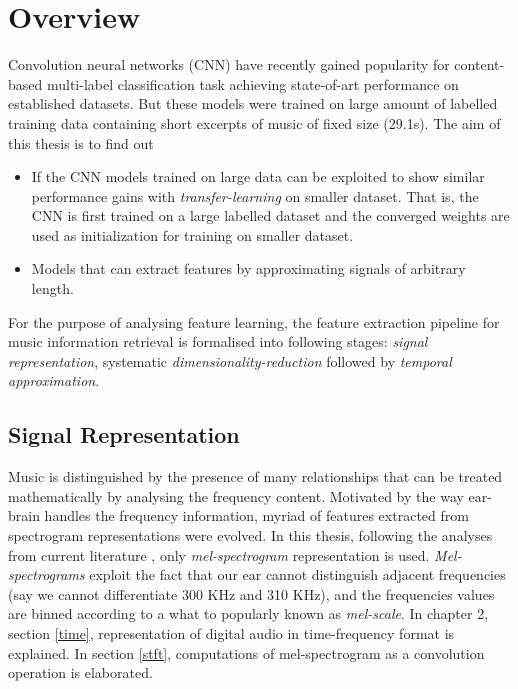 \section{Overview}
\label{overview}
Convolution neural networks (CNN) have recently gained popularity for content-based multi-label classification task achieving state-of-art performance\cite{choi_cnn}\cite{choi_crnn} on established datasets\cite{MSD}\cite{MTT}. But these models were trained on large amount of labelled training data containing short excerpts of music of fixed size (29.1s). The aim of this thesis is to find out
\begin{itemize}
\setlength\itemsep{0em}
\item If the CNN models trained on large data can be exploited to show similar performance gains with \textit{transfer-learning} on smaller dataset. That is, the CNN is first trained on a large labelled dataset and the converged weights are used as initialization for training on smaller dataset. 
\item Models that can extract features by approximating signals of arbitrary length.
\end{itemize} 
    
\noindent For the purpose of analysing feature learning, the feature extraction pipeline for music information retrieval is formalised into following stages: \textit{signal representation}, systematic \textit{dimensionality-reduction} followed by \textit{temporal approximation}.
  
\subsection{Signal Representation}
Music is distinguished by the presence of many relationships that can be treated mathematically by analysing the frequency content. Motivated by the way ear-brain handles the frequency information, myriad of features extracted from spectrogram representations were evolved. In this thesis, following the analyses from current literature \cite{choi_cnn}\cite{EndToEnd}\cite{MultiScale}\cite{choi_crnn}, only \textit{mel-spectrogram} representation is used. \textit{Mel-spectrograms} exploit the fact that our ear cannot distinguish adjacent frequencies (say we cannot differentiate 300 KHz and 310 KHz), and the frequencies values are binned according to a what to popularly known as \textit{mel-scale}. In chapter 2, section \ref{time}, representation of digital audio in time-frequency format is explained. In section \ref{stft}, computations of mel-spectrogram as a convolution operation is elaborated.
   
